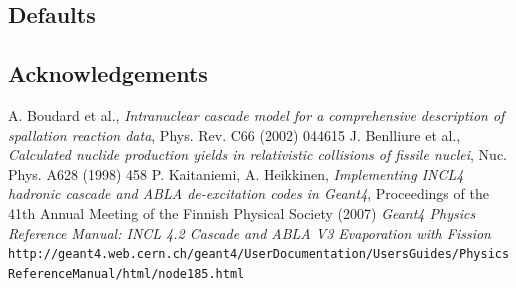 \documentclass[10pt]{article}
\newenvironment{textbox}
{\begin{lrbox}{\dummybox}\begin{minipage}{0.9\columnwidth}}
{\end{minipage}\end{lrbox}\raisebox{-\depth}{\psshadowbox[framesep=1em,framearc=.1,shadow=true]{\usebox{\dummybox}}}\vspace{0.005\textheight}}
\begin{document}
\begin{center}
\begin{multicols}{3}
\begin{textbox}
\end{textbox}
\begin{textbox}


\section*{\color{udsect} Defaults}
 
 
\end{textbox}
\begin{textbox}


\section*{\color{udsect} Acknowledgements}



\end{textbox}
\begin{textbox}

{\small
{}
\begin{thebibliography}{9}
 A. Boudard et al., \emph{Intranuclear cascade model for
    a comprehensive description of spallation reaction data}, Phys.
  Rev. C66 (2002) 044615
 J. Benlliure et al., \emph{Calculated nuclide
    production yields in relativistic collisions of fissile nuclei},
  Nuc. Phys. A628 (1998) 458
 P. Kaitaniemi, A. Heikkinen, \emph{Implementing INCL4
    hadronic cascade and ABLA de-excitation codes in Geant4},
  Proceedings of the 41th Annual Meeting of the Finnish Physical
  Society (2007)
 \emph{Geant4 Physics Reference Manual: INCL 4.2 Cascade and ABLA V3 Evaporation with Fission} {\tt http://geant4.web.cern.ch/\-geant4/\-UserDocumentation/\-UsersGuides/\-PhysicsReferenceManual/\-html/\-node185.html}
%
%
\end{thebibliography}
}

\end{textbox}

\end{multicols}

\end{center}
\end{document}
